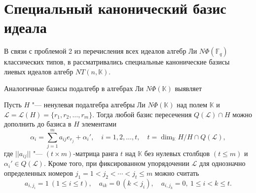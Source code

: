 \documentclass[a4paper,14pt,oneside,openany]{memoir}
\begin{document}
\section{Специальный канонический базис идеала}\label{sec:canonicalbase}

В связи с проблемой 2 из \cite{sigsam2001} перечисления всех идеалов алгебр Ли
$N\Phi(\mathbb{F}_q)$ классических типов, в \cite[\S~4]{vmj2015}
рассматривались специальные канонические базисы лиевых идеалов алгебр
$NT(n,\mathbb{K})$.

\medskip

Аналогичные базисы подалгебр в алгебрах Ли $N\Phi(\mathbb{K})$ выявляет

\begin{lemma}\label{l:LieIdeal}
    Пусть $H$ "--- ненулевая подалгебра алгебры Ли $N\Phi(\mathbb{K})$ над полем
    $\mathbb{K}$ и $\mathcal{L} = \mathcal{L}(H)= \{r_1, r_2, \dots, r_m\}$. Тогда
    любой базис пересечения $Q(\mathcal{L})\cap H$ можно дополнить до базиса в $H$
    элементами
    \begin{equation}\label{eq:base1'}
        \alpha_i=  \sum_{j=1}^m a_{ij}e_{r_j}+\alpha_i' ,\quad
        i=1,2,\dots, t,\quad  t= \dim_{\mathbb{K}} H / H \cap Q(\mathcal{L}),
    \end{equation}
    где $||a_{ij}||$ "--- $(t\times m)$-матрица ранга $t$ над $\mathbb{K}$ без
    нулевых столбцов $(t \leq m)$ и $\alpha_i' \in Q(\mathcal{L})$. Кроме того, при фиксированном
    упорядочении $\mathcal{L}$ для однозначно определенных номеров
    $j_1=1<j_2<\cdots <j_t \leq m$ можно считать
    \begin{equation}\label{eq:base-1}
        a_{i,j_i}=1\ (1\leq i\leq t),\quad a_{ik}=0\ (k<j_i),\quad
        a_{i,j_k}=0,\ 1\leq i<k\leq t.
    \end{equation}
\end{lemma}
\end{document}
